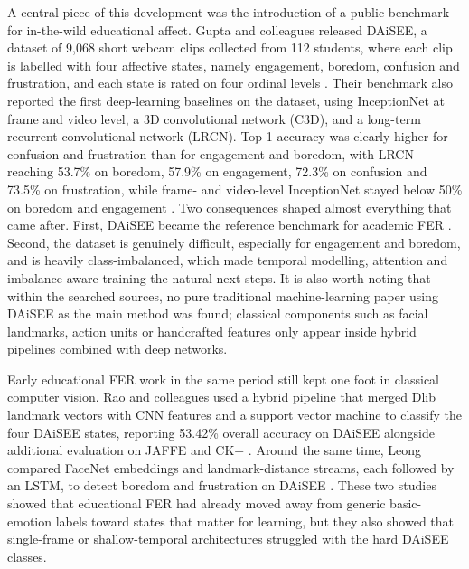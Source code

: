 A central piece of this development was the introduction of a public benchmark for in-the-wild educational affect. Gupta and colleagues released DAiSEE, a dataset of 9{,}068 short webcam clips collected from 112 students, where each clip is labelled with four affective states, namely engagement, boredom, confusion and frustration, and each state is rated on four ordinal levels \cite{gupta_daisee_2016}. Their benchmark also reported the first deep-learning baselines on the dataset, using InceptionNet at frame and video level, a 3D convolutional network (C3D), and a long-term recurrent convolutional network (LRCN). Top-1 accuracy was clearly higher for confusion and frustration than for engagement and boredom, with LRCN reaching 53.7\% on boredom, 57.9\% on engagement, 72.3\% on confusion and 73.5\% on frustration, while frame- and video-level InceptionNet stayed below 50\% on boredom and engagement \cite{gupta_daisee_2016}. Two consequences shaped almost everything that came after. First, DAiSEE became the reference benchmark for academic FER \cite{lek_academic_2023}. Second, the dataset is genuinely difficult, especially for engagement and boredom, and is heavily class-imbalanced, which made temporal modelling, attention and imbalance-aware training the natural next steps. It is also worth noting that within the searched sources, no pure traditional machine-learning paper using DAiSEE as the main method was found; classical components such as facial landmarks, action units or handcrafted features only appear inside hybrid pipelines combined with deep networks.

Early educational FER work in the same period still kept one foot in classical computer vision. Rao and colleagues used a hybrid pipeline that merged Dlib landmark vectors with CNN features and a support vector machine to classify the four DAiSEE states, reporting 53.42\% overall accuracy on DAiSEE alongside additional evaluation on JAFFE and CK+ \cite{rao_recognition_2021}. Around the same time, Leong compared FaceNet embeddings and landmark-distance streams, each followed by an LSTM, to detect boredom and frustration on DAiSEE \cite{leong_deep_2020}. These two studies showed that educational FER had already moved away from generic basic-emotion labels toward states that matter for learning, but they also showed that single-frame or shallow-temporal architectures struggled with the hard DAiSEE classes.

